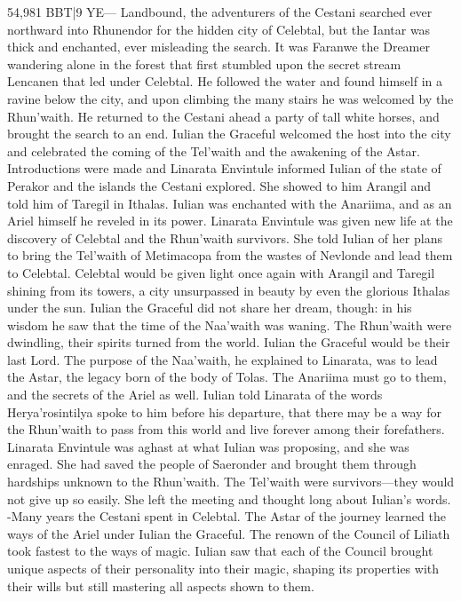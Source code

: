 \documentclass[smalldemyvopaper,11pt,twoside,onecolumn,openright,extrafontsizes]{memoir}
\begin{document}
{{54,981 BBT|9 YE— Landbound, the adventurers of the Cestani searched ever northward into Rhunendor for the hidden city of Celebtal, but the Iantar was thick and enchanted, ever misleading the search. It was Faranwe the Dreamer wandering alone in the forest that first stumbled upon the secret stream Lencanen that led under Celebtal. He followed the water and found himself in a ravine below the city, and upon climbing the many stairs he was welcomed by the Rhun’waith. He returned to the Cestani ahead a party of tall white horses, and brought the search to an end. Iulian the Graceful welcomed the host into the city and celebrated the coming of the Tel’waith and the awakening of the Astar. Introductions were made and Linarata Envintule informed Iulian of the state of Perakor and the islands the Cestani explored. She showed to him Arangil and told him of Taregil in Ithalas. Iulian was enchanted with the Anariima, and as an Ariel himself he reveled in its power. Linarata Envintule was given new life at the discovery of Celebtal and the Rhun’waith survivors. She told Iulian of her plans to bring the Tel’waith of Metimacopa from the wastes of Nevlonde and lead them to Celebtal. Celebtal would be given light once again with Arangil and Taregil shining from its towers, a city unsurpassed in beauty by even the glorious Ithalas under the sun. Iulian the Graceful did not share her dream, though: in his wisdom he saw that the time of the Naa’waith was waning. The Rhun’waith were dwindling, their spirits turned from the world. Iulian the Graceful would be their last Lord. The purpose of the Naa’waith, he explained to Linarata, was to lead the Astar, the legacy born of the body of Tolas. The Anariima must go to them, and the secrets of the Ariel as well. Iulian told Linarata of the words Herya’rosintilya spoke to him before his departure, that there may be a way for the Rhun’waith to pass from this world and live forever among their forefathers. Linarata Envintule was aghast at what Iulian was proposing, and she was enraged. She had saved the people of Saeronder and brought them through hardships unknown to the Rhun’waith. The Tel’waith were survivors—they would not give up so easily. She left the meeting and thought long about Iulian’s words.
-Many years the Cestani spent in Celebtal. The Astar of the journey learned the ways of the Ariel under Iulian the Graceful. The renown of the Council of Liliath took fastest to the ways of magic. Iulian saw that each of the Council brought unique aspects of their personality into their magic, shaping its properties with their wills but still mastering all aspects shown to them.

}}
\end{document}
